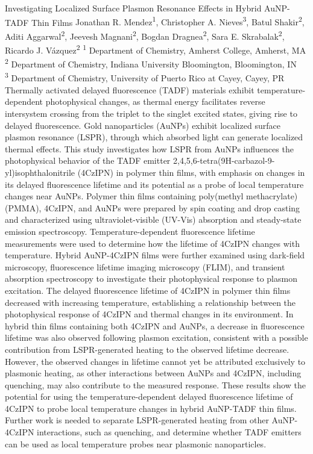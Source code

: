 \makeabstract
    {
    Investigating Localized Surface Plasmon Resonance Effects in Hybrid AuNP-TADF Thin Films
    }
    {
    Jonathan R. Mendez\textsuperscript{1}, Christopher A. Nieves\textsuperscript{3}, Batul Shakir\textsuperscript{2}, Aditi Aggarwal\textsuperscript{2}, Jeevesh Magnani\textsuperscript{2}, Bogdan Dragnea\textsuperscript{2}, Sara E. Skrabalak\textsuperscript{2}, Ricardo J. V\'azquez\textsuperscript{2}
    }
    {
    \textsuperscript{1} Department of Chemistry, Amherst College, Amherst, MA\\
\textsuperscript{2} Department of Chemistry, Indiana University Bloomington, Bloomington, IN\\
\textsuperscript{3} Department of Chemistry, University of Puerto Rico at Cayey, Cayey, PR
    }
    {
    Thermally activated delayed fluorescence (TADF) materials exhibit temperature-dependent photophysical changes, as thermal energy facilitates reverse intersystem crossing from the triplet to the singlet excited states, giving rise to delayed fluorescence. Gold nanoparticles (AuNPs) exhibit localized surface plasmon resonance (LSPR), through which absorbed light can generate localized thermal effects. This study investigates how LSPR from AuNPs influences the photophysical behavior of the TADF emitter 2,4,5,6-tetra(9H-carbazol-9-yl)isophthalonitrile (4CzIPN) in polymer thin films, with emphasis on changes in its delayed fluorescence lifetime and its potential as a probe of local temperature changes near AuNPs.
    }
    {
    Polymer thin films containing poly(methyl methacrylate) (PMMA), 4CzIPN, and AuNPs were prepared by spin coating and drop casting and characterized using ultraviolet-visible (UV-Vis) absorption and steady-state emission spectroscopy. Temperature-dependent fluorescence lifetime measurements were used to determine how the lifetime of 4CzIPN changes with temperature. Hybrid AuNP-4CzIPN films were further examined using dark-field microscopy, fluorescence lifetime imaging microscopy (FLIM), and transient absorption spectroscopy to investigate their photophysical response to plasmon excitation.
    }
    {
    The delayed fluorescence lifetime of 4CzIPN in polymer thin films decreased with increasing temperature, establishing a relationship between the photophysical response of 4CzIPN and thermal changes in its environment. In hybrid thin films containing both 4CzIPN and AuNPs, a decrease in fluorescence lifetime was also observed following plasmon excitation, consistent with a possible contribution from LSPR-generated heating to the observed lifetime decrease. However, the observed changes in lifetime cannot yet be attributed exclusively to plasmonic heating, as other interactions between AuNPs and 4CzIPN, including quenching, may also contribute to the measured response.
    }
    {
    These results show the potential for using the temperature-dependent delayed fluorescence lifetime of 4CzIPN to probe local temperature changes in hybrid AuNP-TADF thin films. Further work is needed to separate LSPR-generated heating from other AuNP-4CzIPN interactions, such as quenching, and determine whether TADF emitters can be used as local temperature probes near plasmonic nanoparticles.
    }

    \newpage
    